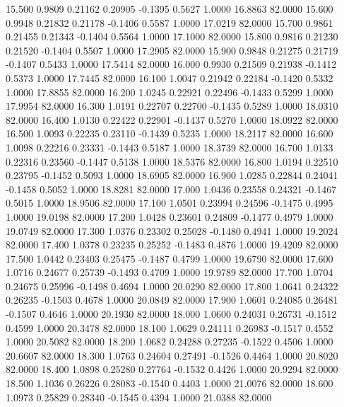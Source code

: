   15.500   0.9809   0.21162   0.20905  -0.1395   0.5627   1.0000  16.8863  82.0000
  15.600   0.9948   0.21832   0.21178  -0.1406   0.5587   1.0000  17.0219  82.0000
  15.700   0.9861   0.21455   0.21343  -0.1404   0.5564   1.0000  17.1000  82.0000
  15.800   0.9816   0.21230   0.21520  -0.1404   0.5507   1.0000  17.2905  82.0000
  15.900   0.9848   0.21275   0.21719  -0.1407   0.5433   1.0000  17.5414  82.0000
  16.000   0.9930   0.21509   0.21938  -0.1412   0.5373   1.0000  17.7445  82.0000
  16.100   1.0047   0.21942   0.22184  -0.1420   0.5332   1.0000  17.8855  82.0000
  16.200   1.0245   0.22921   0.22496  -0.1433   0.5299   1.0000  17.9954  82.0000
  16.300   1.0191   0.22707   0.22700  -0.1435   0.5289   1.0000  18.0310  82.0000
  16.400   1.0130   0.22422   0.22901  -0.1437   0.5270   1.0000  18.0922  82.0000
  16.500   1.0093   0.22235   0.23110  -0.1439   0.5235   1.0000  18.2117  82.0000
  16.600   1.0098   0.22216   0.23331  -0.1443   0.5187   1.0000  18.3739  82.0000
  16.700   1.0133   0.22316   0.23560  -0.1447   0.5138   1.0000  18.5376  82.0000
  16.800   1.0194   0.22510   0.23795  -0.1452   0.5093   1.0000  18.6905  82.0000
  16.900   1.0285   0.22844   0.24041  -0.1458   0.5052   1.0000  18.8281  82.0000
  17.000   1.0436   0.23558   0.24321  -0.1467   0.5015   1.0000  18.9506  82.0000
  17.100   1.0501   0.23994   0.24596  -0.1475   0.4995   1.0000  19.0198  82.0000
  17.200   1.0428   0.23601   0.24809  -0.1477   0.4979   1.0000  19.0749  82.0000
  17.300   1.0376   0.23302   0.25028  -0.1480   0.4941   1.0000  19.2024  82.0000
  17.400   1.0378   0.23235   0.25252  -0.1483   0.4876   1.0000  19.4209  82.0000
  17.500   1.0442   0.23403   0.25475  -0.1487   0.4799   1.0000  19.6790  82.0000
  17.600   1.0716   0.24677   0.25739  -0.1493   0.4709   1.0000  19.9789  82.0000
  17.700   1.0704   0.24675   0.25996  -0.1498   0.4694   1.0000  20.0290  82.0000
  17.800   1.0641   0.24322   0.26235  -0.1503   0.4678   1.0000  20.0849  82.0000
  17.900   1.0601   0.24085   0.26481  -0.1507   0.4646   1.0000  20.1930  82.0000
  18.000   1.0600   0.24031   0.26731  -0.1512   0.4599   1.0000  20.3478  82.0000
  18.100   1.0629   0.24111   0.26983  -0.1517   0.4552   1.0000  20.5082  82.0000
  18.200   1.0682   0.24288   0.27235  -0.1522   0.4506   1.0000  20.6607  82.0000
  18.300   1.0763   0.24604   0.27491  -0.1526   0.4464   1.0000  20.8020  82.0000
  18.400   1.0898   0.25280   0.27764  -0.1532   0.4426   1.0000  20.9294  82.0000
  18.500   1.1036   0.26226   0.28083  -0.1540   0.4403   1.0000  21.0076  82.0000
  18.600   1.0973   0.25829   0.28340  -0.1545   0.4394   1.0000  21.0388  82.0000

